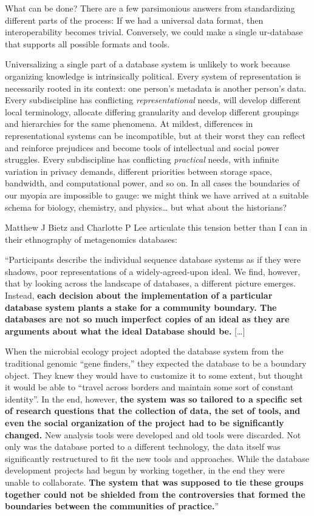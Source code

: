 \documentclass[10pt]{article}
\begin{document}
\begin{multicols}{2}
What can be done? There are a few parsimonious answers from
standardizing different parts of the process: If we had a universal data
format, then interoperability becomes trivial. Conversely, we could make
a single ur-database that supports all possible formats and tools.

Universalizing a single part of a database system is unlikely to work
because organizing knowledge is intrinsically political. Every system of
representation is necessarily rooted in its context: one person's
metadata is another person's data. Every subdiscipline has conflicting
\emph{representational} needs, will develop different local terminology,
allocate differing granularity and develop different groupings and
hierarchies for the same phenomena. At mildest, differences in
representational systems can be incompatible, but at their worst they
can reflect and reinforce prejudices and become tools of intellectual
and social power struggles. Every subdiscipline has conflicting
\emph{practical} needs, with infinite variation in privacy demands,
different priorities between storage space, bandwidth, and computational
power, and so on. In all cases the boundaries of our myopia are
impossible to gauge: we might think we have arrived at a suitable schema
for biology, chemistry, and physics\ldots{} but what about the
historians?

Matthew J Bietz and Charlotte P Lee articulate this tension better than
I can in their ethnography of metagenomics databases:

\begin{leftbar}
``Participants describe the individual sequence database systems as if
they were shadows, poor representations of a widely-agreed-upon ideal.
We find, however, that by looking across the landscape of databases, a
different picture emerges. Instead, \textbf{each decision about the
implementation of a particular database system plants a stake for a
community boundary. The databases are not so much imperfect copies of an
ideal as they are arguments about what the ideal Database should be.}
{[}\ldots{]}

When the microbial ecology project adopted the database system from the
traditional genomic ``gene finders,'' they expected the database to be a
boundary object. They knew they would have to customize it to some
extent, but thought it would be able to ``travel across borders and
maintain some sort of constant identity''. In the end, however,
\textbf{the system was so tailored to a specific set of research
questions that the collection of data, the set of tools, and even the
social organization of the project had to be significantly changed.} New
analysis tools were developed and old tools were discarded. Not only was
the database ported to a different technology, the data itself was
significantly restructured to fit the new tools and approaches. While
the database development projects had begun by working together, in the
end they were unable to collaborate. \textbf{The system that was
supposed to tie these groups together could not be shielded from the
controversies that formed the boundaries between the communities of
practice.}'' \cite{bietzCollaborationMetagenomicsSequence2009} 
\end{leftbar}


\end{multicols}
\end{document}
